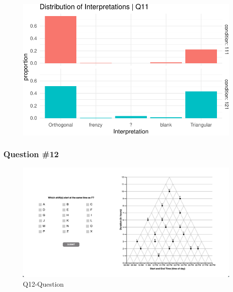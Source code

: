 \documentclass[
  letterpaper,
  DIV=11,
  numbers=noendperiod]{scrreprt}
\begin{document}
\begin{figure}[H]

{\centering \includegraphics{analysis/SGC3A/2_sgc3A_scoring_files/figure-pdf/Q11-distribution-2.pdf}

}

\end{figure}

\hypertarget{question-12}{%
\subsubsection{Question \#12}\label{question-12}}

\begin{figure}

{\centering \includegraphics{analysis/SGC3A/static/questions/Q12.png}

}

\caption{\label{fig-Q12}Q12-Question}

\end{figure}
\end{document}
